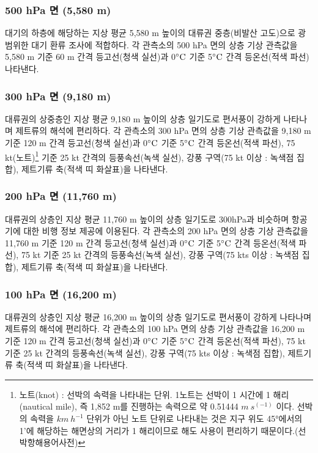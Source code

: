 \subsubsection{500 hPa 면 (5,580 m)}
대기의 하층에 해당하는 지상 평균 5,580 m 높이의 대류권 중층(비발산 고도)으로 광범위한 대기 환류 조사에 적합하다. 각 관측소의 500 hPa 면의 상층 기상 관측값을 5,580 m 기준 60 m 간격 등고선(청색 실선)과 0$\rm ^{\circ}C$ 기준 5$\rm ^{\circ}C$ 간격 등온선(적색 파선) 나타낸다. 

\subsubsection{300 hPa 면 (9,180 m)}
대류권의 상중층인 지상 평균 9,180 m 높이의 상층 일기도로 편서풍이 강하게 나타나며 제트류의 해석에 편리하다. 각 관측소의 300 hPa 면의 상층 기상 관측값을 9,180 m 기준 120 m 간격 등고선(청색 실선)과 0$\rm ^{\circ}C$ 기준 5$\rm ^{\circ}C$ 간격 등온선(적색 파선), 75 kt(노트)\footnote{노트(knot) : 선박의 속력을 나타내는 단위. 1노트는 선박이 1 시간에 1 해리 (nautical mile), 즉 1,852 m를 진행하는 속력으로 약 0.51444 $m~s^(-1)$ 이다. 선박의 속력을 $ km~h^{-1}$ 단위가 아닌 노트 단위로 나타내는 것은 지구 위도 45°에서의 1'에 해당하는 해면상의 거리가 1 해리이므로 해도 사용이 편리하기 때문이다.(선박항해용어사전)} 기준 25 kt 간격의 등풍속선(녹색 실선), 강풍 구역(75 kt 이상 :  녹색점 집합), 제트기류 축(적색 띠 화살표)을 나타낸다. 

\subsubsection{200 hPa 면 (11,760 m)}
대류권의 상층인 지상 평균 11,760 m 높이의 상층 일기도로 300hPa과 비슷하며 항공기에 대한 비행 정보 제공에 이용된다. 각 관측소의 200 hPa 면의 상층 기상 관측값을 11,760 m 기준 120 m 간격 등고선(청색 실선)과 0$\rm ^{\circ}C$ 기준 5$\rm ^{\circ}C$ 간격 등온선(적색 파선), 75 kt 기준 25 kt 간격의 등풍속선(녹색 실선), 강풍 구역(75 kts 이상 :  녹색점 집합), 제트기류 축(적색 띠 화살표)을 나타낸다. 

\subsubsection{100 hPa 면 (16,200 m)}
대류권의 상층인 지상 평균 16,200 m 높이의 상층 일기도로 편서풍이 강하게 나타나며 제트류의 해석에 편리하다. 각 관측소의 100 hPa 면의 상층 기상 관측값을 16,200 m 기준 120 m 간격 등고선(청색 실선)과 0$\rm ^{\circ}C$ 기준 5$\rm ^{\circ}C$ 간격 등온선(적색 파선), 75 kt 기준 25 kt 간격의 등풍속선(녹색 실선), 강풍 구역(75 kts 이상 :  녹색점 집합), 제트기류 축(적색 띠 화살표)을 나타낸다. 

